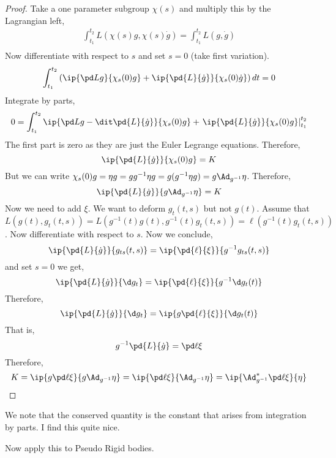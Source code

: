 \begin{proof}
  Take a one parameter subgroup $\chi(s)$ and multiply this by the Lagrangian left,
  \begin{align*}
    \int_{t_1}^{t_2} L(\chi(s)g, \chi(s)\dot g) = \int_{t_1}^{t_2} L(g, \dot g) \\
  \end{align*}
  Now differentiate with respect to $s$ and set $s = 0$ (take first variation).
  $$ \int_{t_1}^{t_2} \left(\ip{\pd L g}{\chi_s(0)g} + \ip{\pd{L}{\dot g}}{\chi_s(0)\dot g}\right)dt = 0 $$
  Integrate by parts,
  $$ 0 = \int_{t_1}^{t_2} \ip{\pd L g - \dit \pd{L}{\dot g}}{\chi_s(0)g} + \left.\ip{\pd{L}{\dot g}}{\chi_s(0)g}\right|_{t_1}^{t_2} $$
  The first part is zero as they are just the Euler Legrange equations. Therefore,
  $$ \ip{\pd{L}{\dot g}}{\chi_s(0)g} = K $$
  But we can write $\chi_s(0)g = \eta g = gg^{-1}\eta g = g(g^{-1}\eta g) = g\Ad_{g^{-1}}\eta$. Therefore,
  $$ \ip{\pd{L}{\dot g}}{g\Ad_{g^{-1}}\eta} = K $$
  Now we need to add $\xi$. We want to deform $g_t(t, s)$ but not $g(t)$. Assume that $L(g(t), g_t(t, s)) = L(g^{-1}(t)g(t),  g^{-1}(t)g_t(t, s)) = \ell(g^{-1}(t)g_t(t,s))$. Now differentiate with respect to $s$. Now we conclude,
  $$ \ip{\pd{L}{\dot g}}{g_{ts}(t, s)} = \ip{\pd{\ell}{\xi}}{g^{-1}g_{ts}(t, s)} $$
   and set $s = 0$ we get,
   $$ \ip{\pd{L}{\dot g}}{\d g_{t}} = \ip{\pd{\ell}{\xi}}{g^{-1}\d g_{t}(t)} $$
   Therefore,
   $$ \ip{\pd{L}{\dot g}}{\d g_{t}} = \ip{g\pd{\ell}{\xi}}{\d g_{t}(t)} $$
   That is,
   $$ g^{-1}\pd{L}{\dot g} = \pd \ell \xi $$
   Therefore,
   $$ K = \ip{g\pd \ell \xi}{g\Ad_{g^{-1}}\eta} = \ip{\pd \ell \xi}{\Ad_{g^{-1}}\eta} = \ip{\Ad^*_{g^{-1}}\pd \ell \xi}{\eta} $$
\end{proof}

\noindent
We note that the conserved quantity is the constant that arises from integration by parts. I find this quite nice.

\begin{eg}
  Now apply this to Pseudo Rigid bodies.
\end{eg}